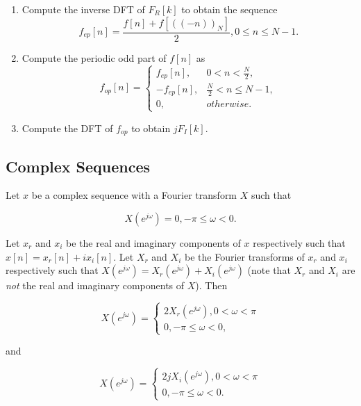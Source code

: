 \begin{enumerate}
	\item Compute the inverse DFT of $F_R[k]$ to obtain the sequence
	\begin{equation*}
		f_{ep}[n] = \frac{f[n] + f[((-n))_N]}{2}, 0 \leq n \leq N - 1.
	\end{equation*}
	
	\item Compute the periodic odd part of $f[n]$ as
	\begin{equation*}
		f_{op}[n] = \begin{cases}
			f_{ep}[n], & 0 < n < \frac{N}{2}, \\
			-f_{ep}[n], & \frac{N}{2} < n \leq N - 1, \\
			0, & otherwise.
		\end{cases}
	\end{equation*}
	
	\item Compute the DFT of $f_{op}$ to obtain $jF_I[k]$.
\end{enumerate}

\subsection{Complex Sequences}
Let $x$ be a complex sequence with a Fourier transform $X$ such that

\begin{equation*}
	X(e^{j\omega}) = 0, -\pi \leq \omega < 0.
\end{equation*}

Let $x_r$ and $x_i$ be the real and imaginary components of $x$ respectively such that $x[n] = x_r[n] + ix_i[n]$. Let $X_r$ and $X_i$ be the Fourier transforms of $x_r$ and $x_i$ respectively such that $X(e^{j\omega}) = X_r(e^{j\omega}) + X_i(e^{j\omega})$ (note that $X_r$ and $X_i$ are \textit{not} the real and imaginary components of $X$). Then

\begin{equation}
	X(e^{j\omega}) = \begin{cases}
		2X_r(e^{j\omega}), 0 < \omega < \pi \\
		0, -\pi \leq \omega < 0,
	\end{cases}
\end{equation}

and

\begin{equation}
	X(e^{j\omega}) = \begin{cases}
		2jX_i(e^{j\omega}), 0 < \omega < \pi \\
		0, -\pi \leq \omega < 0.
	\end{cases}
\end{equation}

